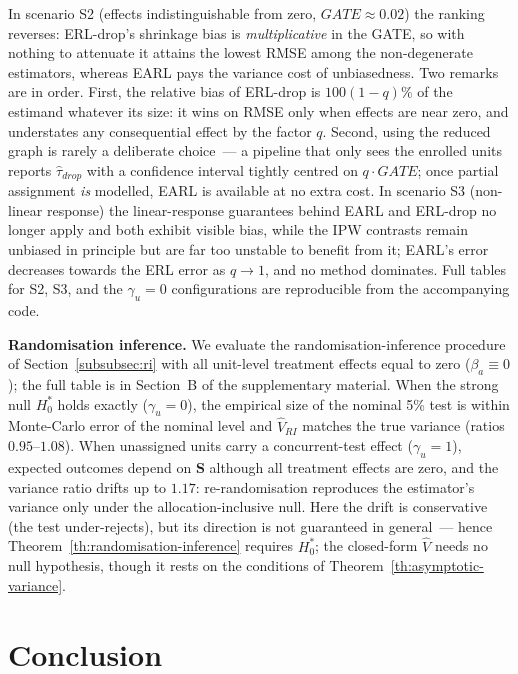 \documentclass[sigconf,anonymous,review]{acmart}
\begin{document}
In scenario S2 (effects indistinguishable from zero, $GATE\approx0.02$) the ranking reverses: ERL-drop's shrinkage bias is \emph{multiplicative} in the GATE, so with nothing to attenuate it attains the lowest RMSE among the non-degenerate estimators, whereas EARL pays the variance cost of unbiasedness. Two remarks are in order. First, the relative bias of ERL-drop is $100(1-q)\%$ of the estimand whatever its size: it wins on RMSE only when effects are near zero, and understates any consequential effect by the factor $q$. Second, using the reduced graph is rarely a deliberate choice~--- a pipeline that only sees the enrolled units reports $\hat\tau_{drop}$ with a confidence interval tightly centred on $q\cdot GATE$; once partial assignment \emph{is} modelled, EARL is available at no extra cost. In scenario S3 (non-linear response) the linear-response guarantees behind EARL and ERL-drop no longer apply and both exhibit visible bias, while the IPW contrasts remain unbiased in principle but are far too unstable to benefit from it; EARL's error decreases towards the ERL error as $q\to1$, and no method dominates. Full tables for S2, S3, and the $\gamma_u=0$ configurations are reproducible from the accompanying code.


\textbf{Randomisation inference.} We evaluate the randomisation-inference procedure of Section~\ref{subsubsec:ri} with all unit-level treatment effects equal to zero ($\beta_a\equiv 0$); the full table is in Section~B of the supplementary material. When the strong null $H_0^*$ holds exactly ($\gamma_u=0$), the empirical size of the nominal 5\% test is within Monte-Carlo error of the nominal level and $\hat V_{RI}$ matches the true variance (ratios $0.95$--$1.08$). When unassigned units carry a concurrent-test effect ($\gamma_u=1$), expected outcomes depend on $\mathbf S$ although all treatment effects are zero, and the variance ratio drifts up to $1.17$: re-randomisation reproduces the estimator's variance only under the allocation-inclusive null. Here the drift is conservative (the test under-rejects), but its direction is not guaranteed in general~--- hence Theorem~\ref{th:randomisation-inference} requires $H_0^*$; the closed-form $\hat V$ needs no null hypothesis, though it rests on the conditions of Theorem~\ref{th:asymptotic-variance}.

\section{Conclusion}\label{sec:conclusion}
\end{document}
